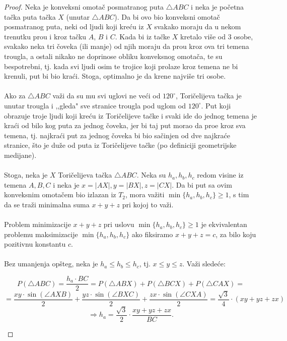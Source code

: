 \documentclass[11pt,letter]{article}
\begin{document}
\begin{proof}
Neka je konveksni omota\v c posmatranog puta $\bigtriangleup ABC$ i neka je po\v cetna ta\v cka puta ta\v cka $X$ (unutar $\bigtriangleup ABC$). Da bi ovo bio konveksni omota\v c posmatranog puta, neki od ljudi koji kre\' cu iz $X$ svakako moraju da u nekom trenutku pro\dj u i kroz ta\v cku $A$, $B$ i $C$. Kada bi iz ta\v cke $X$ kretalo vi\v se od 3 osobe, svakako neka tri \v coveka (ili manje) od njih moraju da pro\dj u kroz ova tri temena trougla, a ostali nikako ne doprinose obliku konveksnog omota\v ca, te su bespotrebni, tj. kada svi ljudi osim te trojice koji prolaze kroz temena ne bi krenuli, put bi bio kra\' ci. Stoga, optimalno je da krene najvi\v se tri osobe. 
\\
\\
\indent Ako za $\bigtriangleup ABC$ va\v zi da su mu svi uglovi ne ve\' ci od $120^\circ$, Tori\v celijeva ta\v cka je unutar trougla i ,,gleda" sve stranice trougla pod uglom od $120^\circ$. Put koji obrazuje troje ljudi koji kre\' cu iz Tori\v celijeve ta\v cke i svaki ide do jednog temena je kra\' ci od bilo kog puta za jednog \v coveka, jer bi taj put morao da pro\dj e kroz sva temena, tj. najkra\' ci put za jednog \v coveka bi bio sa\v cinjen od dve najkra\' ce stranice, \v sto je du\v ze od puta iz Tori\v celijeve ta\v cke (po definiciji geometrijske medijane).
\\
\\
\indent Stoga, neka je $X$ Tori\v celijeva ta\v cka $\bigtriangleup ABC$. Neka su $h_a, h_b, h_c$ redom visine iz temena $A, B, C$ i neka je $x=|AX|, y=|BX|, z=|CX|$. Da bi put sa ovim konveksnim omota\v cem bio izlazan iz $T_2$, mora va\v ziti $\min{\{h_a,h_b,h_c\}}\geqslant 1$, s tim da se tra\v zi minimalna suma $x+y+z$ pri kojoj to va\v zi.
\\
\\
\indent Problem minimizacije $x+y+z$ pri uslovu $\min{\{h_a,h_b,h_c\}}\geqslant 1$ je ekvivalentan problemu maksimizacije $\min{\{h_a,h_b,h_c\}}$ ako fiksiramo $x+y+z=c$, za bilo koju pozitivnu konstantu $c$.
\\
\\
\indent Bez umanjenja op\v steg, neka je $h_a\leqslant h_b\leqslant h_c$, tj. $x\leqslant y\leqslant z$. Va\v zi slede\' ce:
\begin{center}
$$P(\bigtriangleup ABC)=\frac{h_a\cdot BC}{2}=P(\bigtriangleup ABX)+P(\bigtriangleup BCX)+P(\bigtriangleup CAX)=$$
$$=\frac{xy\cdot \sin{(\angle AXB)}}{2}+\frac{yz\cdot \sin{(\angle BXC)}}{2}+\frac{zx\cdot \sin(\angle CXA)}{2}=\frac{\sqrt3}{4}\cdot(xy+yz+zx)$$
$$\Longrightarrow h_a=\frac{\sqrt3}{2}\cdot \frac{xy+yz+zx}{BC}.$$
\end{center}
\end{proof} 
\smallskip
\end{document}
